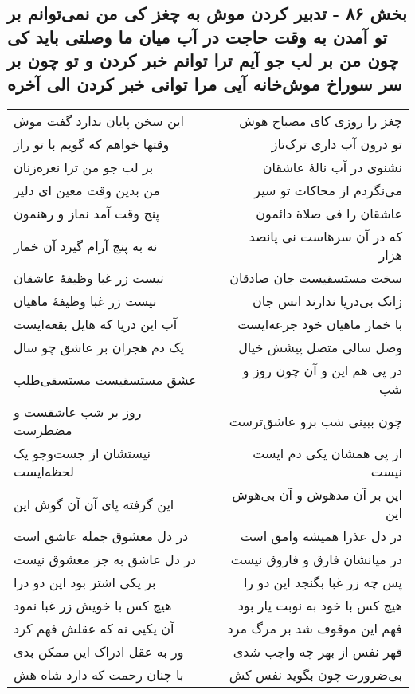 \begin{center}
\section*{بخش ۸۶ - تدبیر کردن موش به چغز کی من نمی‌توانم بر تو آمدن به وقت حاجت در آب میان ما وصلتی باید کی چون من بر لب جو آیم ترا توانم خبر کردن و تو چون بر سر سوراخ موش‌خانه آیی مرا توانی خبر کردن الی آخره}
\label{sec:sh086}
\begin{longtable}{l p{0.5cm} r}
این سخن پایان ندارد گفت موش
&&
چغز را روزی کای مصباح هوش
\\
وقتها خواهم که گویم با تو راز
&&
تو درون آب داری ترک‌تاز
\\
بر لب جو من ترا نعره‌زنان
&&
نشنوی در آب نالهٔ عاشقان
\\
من بدین وقت معین ای دلیر
&&
می‌نگردم از محاکات تو سیر
\\
پنج وقت آمد نماز و رهنمون
&&
عاشقان را فی صلاة دائمون
\\
نه به پنج آرام گیرد آن خمار
&&
که در آن سرهاست نی پانصد هزار
\\
نیست زر غبا وظیفهٔ عاشقان
&&
سخت مستسقیست جان صادقان
\\
نیست زر غبا وظیفهٔ ماهیان
&&
زانک بی‌دریا ندارند انس جان
\\
آب این دریا که هایل بقعه‌ایست
&&
با خمار ماهیان خود جرعه‌ایست
\\
یک دم هجران بر عاشق چو سال
&&
وصل سالی متصل پیشش خیال
\\
عشق مستسقیست مستسقی‌طلب
&&
در پی هم این و آن چون روز و شب
\\
روز بر شب عاشقست و مضطرست
&&
چون ببینی شب برو عاشق‌ترست
\\
نیستشان از جست‌وجو یک لحظه‌ایست
&&
از پی همشان یکی دم ایست نیست
\\
این گرفته پای آن آن گوش این
&&
این بر آن مدهوش و آن بی‌هوش این
\\
در دل معشوق جمله عاشق است
&&
در دل عذرا همیشه وامق است
\\
در دل عاشق به جز معشوق نیست
&&
در میانشان فارق و فاروق نیست
\\
بر یکی اشتر بود این دو درا
&&
پس چه زر غبا بگنجد این دو را
\\
هیچ کس با خویش زر غبا نمود
&&
هیچ کس با خود به نوبت یار بود
\\
آن یکیی نه که عقلش فهم کرد
&&
فهم این موقوف شد بر مرگ مرد
\\
ور به عقل ادراک این ممکن بدی
&&
قهر نفس از بهر چه واجب شدی
\\
با چنان رحمت که دارد شاه هش
&&
بی‌ضرورت چون بگوید نفس کش
\\
\end{longtable}
\end{center}
